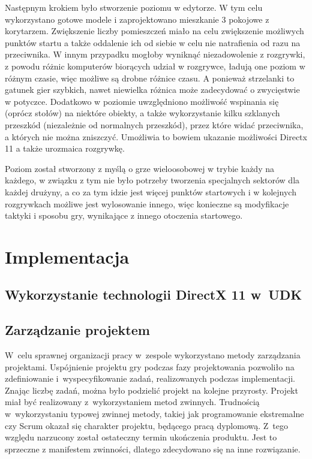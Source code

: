 Następnym krokiem było stworzenie poziomu w edytorze. W tym celu wykorzystano gotowe modele i zaprojektowano mieszkanie 3 pokojowe z korytarzem. Zwiększenie liczby pomieszczeń miało na celu zwiększenie możliwych punktów startu a także oddalenie ich od siebie w celu nie natrafienia od razu na przeciwnika. W innym przypadku mogłoby wyniknąć niezadowolenie z rozgrywki, z powodu różnic komputerów biorących udział w rozgrywce, ładują one poziom w różnym czasie, więc możliwe są drobne różnice czasu. A ponieważ strzelanki to gatunek gier szybkich, nawet niewielka różnica może zadecydować o zwycięstwie w potyczce. Dodatkowo w poziomie uwzględniono możliwość wspinania się (oprócz stołów) na niektóre obiekty, a także wykorzystanie kilku szklanych przeszkód (niezależnie od normalnych przeszkód), przez które widać przeciwnika, a których nie można zniszczyć. Umożliwia to bowiem ukazanie możliwości Directx 11 a także urozmaica rozgrywkę.

Poziom został stworzony z myślą o grze wieloosobowej w trybie każdy na każdego, w związku z tym nie było potrzeby tworzenia specjalnych sektorów dla każdej drużyny, a co za tym idzie jest więcej punktów startowych i w kolejnych rozgrywkach możliwe jest wylosowanie innego, więc konieczne są modyfikacje taktyki i sposobu gry, wynikające z innego otoczenia startowego.

\section{Implementacja}

\subsection{Wykorzystanie technologii DirectX 11 w~UDK}

\subsection{Zarządzanie projektem}
W~celu sprawnej organizacji pracy w~zespole wykorzystano metody zarządzania projektami. Uspójnienie projektu gry podczas fazy projektowania pozwoliło na zdefiniowanie i~wyspecyfikowanie zadań, realizowanych podczas implementacji. Znając liczbę zadań, można było podzielić projekt na kolejne przyrosty. Projekt miał być realizowany z~wykorzystaniem metod zwinnych. Trudnością w~wykorzystaniu typowej zwinnej metody, takiej jak programowanie ekstremalne czy Scrum okazał się charakter projektu, będącego pracą dyplomową. Z~tego względu narzucony został ostateczny termin ukończenia produktu. Jest to sprzeczne z manifestem zwinności, dlatego zdecydowano się na inne rozwiązanie.


